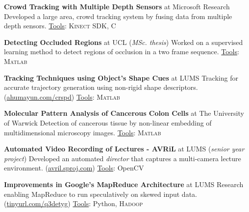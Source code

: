 \documentclass[10pt,twoside,a4paper]{article}
\newif\ifdetail
\newcommand\CPP{C\nolinebreak[4]\hspace{-.05em}\raisebox{.4ex}{\relsize{-3}{\textbf{++}}}}
\begin{document}
\textbf{Crowd Tracking with Multiple Depth Sensors} at Microsoft Research \newline
Developed a large area, crowd tracking system by fusing data from multiple depth sensors. \underline{Tools}: \textsc{Kinect SDK}, \CPP

\textbf{Detecting Occluded Regions} at UCL (\textit{MSc. thesis})\newline
Worked on a supervised learning method to detect regions of occlusion in a two frame sequence. \underline{Tools}: \textsc{Matlab}

\textbf{Tracking Techniques using Object's Shape Cues} at LUMS \newline
\ifdetail Researched tracking techniques for accurate generation of trajectories using object's non-rigid shape descriptors, resilient to occlusion. This was partly funded by NSF. \else Tracking for accurate trajectory generation using non-rigid shape descriptors. \fi (\href{http://ahumayun.com/crspd.html}{ahumayun.com/crspd}) \underline{Tools}: \textsc{Matlab}

\textbf{Molecular Pattern Analysis of Cancerous Colon Cells} at The University of Warwick \newline
\ifdetail A multi-disciplinary project for the detection of cancerous tissue. We developed registration and non-linear embedding techniques for analysis of tissues from a multidimensional imaging process. \else Detection of cancerous tissue by non-linear embedding of multidimensional microscopy images. \fi \underline{Tools}: \textsc{Matlab}

\textbf{Automated Video Recording of Lectures - AVRiL} at LUMS (\textit{senior year project}) \newline
Developed an automated \textit{director} that captures a multi-camera lecture environment. %
(\href{http://avril.sproj.com}{avril.sproj.com}) \underline{Tools}: OpenCV%

\textbf{Improvements in Google's MapReduce Architecture} at LUMS \newline
Research enabling MapReduce to run speculatively on skewed input data. (\href{https://code.google.com/p/mrplus/}{tinyurl.com/q3detyg}) \underline{Tools}: Python, \textsc{Hadoop}

\ifdetail
\textbf{Surveillance Video Compression through Foveation} as a \textit{research initiative} \newline
Researched the development of a novel H.264 encoder which assigns more bits to areas where the human visual system is more likely to foveate in surveillance footage. (\href{http://suraj.lums.edu.pk/~foveation}{http://suraj.lums.edu.pk/\(\sim\)foveation}) \underline{Tools}: \textsc{Java} Media Framework
\fi
\end{document}
